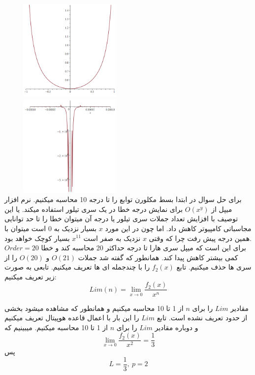 \documentclass[12pt, letterpaper]{article}
\begin{document}
\includegraphics[height=5cm, width=7cm]{figure1.png}
\includegraphics[height=5cm, width=7cm]{figure2.png}
\\


برای حل سوال در ابتدا بسط مکلورن توابع را تا درجه 10 محاسبه میکنیم. نرم افزار میپل از
\(O(x^y)\)
 برای نمایش درجه خطا در یک سری تیلور استفاده میکند. یا این توصیف با افزایش تعداد جملات سری تیلور یا درجه آن میتوان خطا را تا حد توانایی مجاسباتی کامپیوتر کاهش داد. اما چون در این مورد 
\(x\)
 بسیار نزدیک به 0 است میتوان با همین درجه پیش رفت چرا که وقتی 
\(x\) 
 نزدیک به صفر است 
\(x^{11}\)
 بسیار کوچک خواهد بود.
\\
\(Order=20\)
برای این است که میپل سری هارا تا درجه حداکثر 20 محاسبه کند و خطا کمی بیشتر کاهش پیدا کند. همانطور که گفته شد جملات
\(O(21)\)
و 
\(O(20)\)
را از سری ها حذف میکنیم. تابع 
\(f_2(x)\)
 را با چندجمله ای ها تعریف میکنیم. تابعی به صورت زیر تعریف میکنیم:
\[Lim(n) = \lim_{x\to 0}\frac {f_2(x)}{x^n}\]

\vspace{5 mm}
مقادیر 
\(Lim\)
 را برای 
\(n\)
 از 1 تا 10 محاسبه میکنیم و همانطور که مشاهده میشود بخشی از حدود تعریف نشده است.
تابع \(Lim\) را این بار با اعمال قاعده هوپیتال تعریف میکنیم و دوباره مقادیر \(Lim\) را برای \(n\) از 1 تا 10 محاسبه میکنیم. میبینیم که
\[ \lim_{x\to 0}\frac {f_2(x)}{x^2} = \frac{1}{3}\]
پس 
\[ L = \frac{1}{3}, \: p = 2\]
\end{document}
